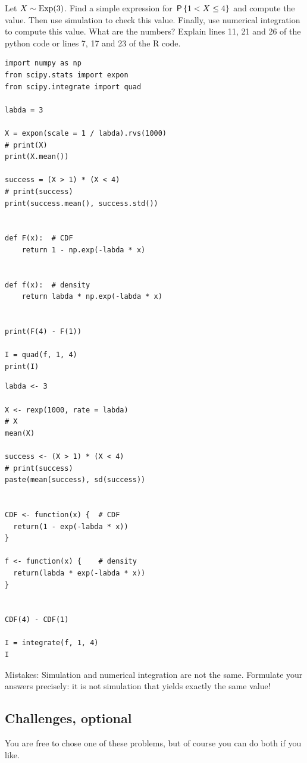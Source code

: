 \documentclass[../../assignments/assignments]{subfiles}
\begin{document}
\begin{exercise}
Let $X\sim\Exp{3}$.
Find a simple expression for $\P{1 < X \leq 4}$ and compute the value.
Then use simulation to check this value.
Finally, use numerical integration to compute this value. What are the numbers? Explain lines 11, 21 and 26 of the python code or lines 7, 17 and 23 of the R code.

\begin{verbatim}
import numpy as np
from scipy.stats import expon
from scipy.integrate import quad

labda = 3

X = expon(scale = 1 / labda).rvs(1000)
# print(X)
print(X.mean())

success = (X > 1) * (X < 4)
# print(success)
print(success.mean(), success.std())


def F(x):  # CDF
    return 1 - np.exp(-labda * x)


def f(x):  # density
    return labda * np.exp(-labda * x)


print(F(4) - F(1))

I = quad(f, 1, 4)
print(I)
\end{verbatim}



\begin{verbatim}
labda <- 3

X <- rexp(1000, rate = labda)
# X
mean(X)

success <- (X > 1) * (X < 4)
# print(success)
paste(mean(success), sd(success))


CDF <- function(x) {  # CDF
  return(1 - exp(-labda * x))
}

f <- function(x) {    # density
  return(labda * exp(-labda * x))
}


CDF(4) - CDF(1)

I = integrate(f, 1, 4)
I
\end{verbatim}
\begin{solution}
Mistakes: Simulation and numerical integration are not the same.
Formulate your answers precisely: it is not simulation that yields exactly the same value!
\end{solution}

\end{exercise}


\subsection{Challenges, optional}

You are free to chose one of these problems, but of course you can do both if you like.
\end{document}
